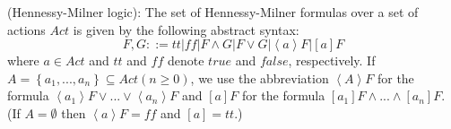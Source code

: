 \begin{definition}
(Hennessy-Milner logic): The set of Hennessy-Milner formulas over a set of actions $Act$ is given by the following abstract syntax:
\begin{equation*}
  F,G::=\mathit{tt} | \mathit{ff} | F\wedge G | F \vee G|\left\langle a \right\rangle F|\left[ a \right] F
\end{equation*}
where $a\in Act$ and $\mathit{tt}$ and $\mathit{ff}$ denote $true$ and $false$, respectively. 
If $A=\left\{ a_{1},...,a_{n} \right\} \subseteq Act \left( n \geq 0\right)$, 
we use the abbreviation $\left\langle A \right\rangle F$ for the formula 
$\left\langle a_{1} \right\rangle F \vee ... \vee \left\langle a_{n} \right\rangle F$ and 
$\left[ a \right] F$ for the formula 
$\left[ a_{1} \right] F \wedge ... \wedge \left[ a_{n} \right]F$. 
(If $A=\emptyset$ then $\left\langle a\right\rangle F=\mathit{ff}$ and $\left[a\right] = \mathit{tt}$.)
\end{definition}
\vspace{3mm}